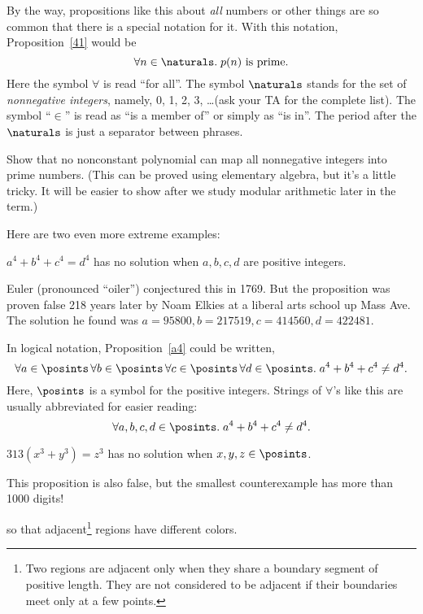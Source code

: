 By the way, propositions like this about \emph{all} numbers or other
things are so common that there is a special notation for it.  With this notation,
Proposition~\ref{41} would be
\begin{equation}\label{pn}
\forall n \in \naturals.\; p(n) \text{ is prime}.
\end{equation}
Here the symbol $\forall$ is read ``for all''.  The symbol $\naturals$
stands for the set of {\em nonnegative integers}, namely, 0, 1, 2, 3,
\dots (ask your TA for the complete list).  The symbol ``$\in$'' is read
as ``is a member of'' or simply as ``is in''.  The period after the
$\naturals$ is just a separator between phrases.

\begin{notesproblem}
Show that no nonconstant polynomial can map all nonnegative integers into
prime numbers.  (This can be proved using elementary algebra, but it's a
little tricky.  It will be easier to show after we study modular
arithmetic later in the term.)
\end{notesproblem}


Here are two even more extreme examples:
\begin{proposition}\label{a4}
$a^4 + b^4 + c^4 = d^4$ has no solution when $a, b, c, d$ are positive
integers.
\end{proposition}
Euler (pronounced ``oiler'') conjectured this in 1769.  But the proposition
was proven false 218 years later by Noam Elkies at a liberal arts school
up Mass Ave.  The solution he found was $a = 95800, b = 217519, c = 414560, d
= 422481$.

In logical notation, Proposition~\ref{a4} could be written,
\[
\forall a \in \posints\, \forall b \in \posints\, \forall c \in \posints\, \forall
d \in \posints.\; a^4 + b^4 + c^4 \neq d^4.
\]
Here, $\posints$ is a symbol for the positive integers.
Strings of $\forall$'s like this are usually abbreviated for easier reading:
\[
\forall a, b, c, d \in \posints.\; a^4 + b^4 + c^4 \neq d^4.
\]


\begin{proposition}
$313 (x^3 + y^3) = z^3$ has no solution when $x, y, z\in\posints$.
\end{proposition}

This proposition is also false, but the smallest counterexample has
more than 1000 digits!

\begin{proposition}
 so that
adjacent\footnote{Two regions are adjacent only when they share a boundary
segment of positive length.  They are not considered to be adjacent if
their boundaries meet only at a few points.} regions have different
colors.
\end{proposition}

